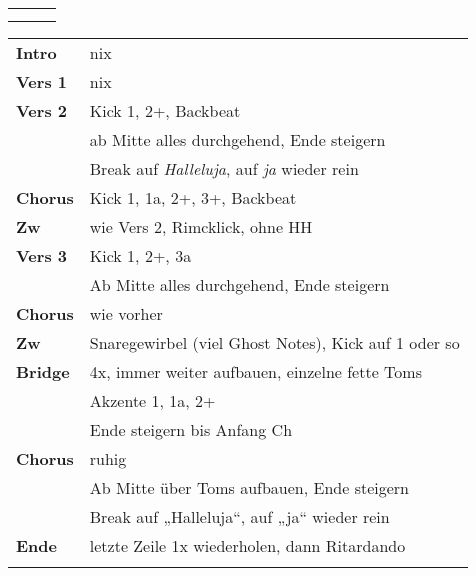 

\begin{tabular}{p{0.6cm}p{12cm}p{1.4cm}}
	\rowcolor{cyan} \myRow{\thesongnumber} & \myRow{Golgatha} & \myRow{79} \\
	                                       &                  &            \\
\end{tabular}

\begin{tabular}{p{1.6cm}l}
	\textbf{Intro}  & nix                                                       \\
	\textbf{Vers 1} & nix                                                       \\
	\textbf{Vers 2} & Kick 1, 2+, Backbeat                                      \\
	                & ab Mitte alles \achtel durchgehend, Ende steigern         \\
	                & Break auf \textit{Halleluja}, auf \textit{ja} wieder rein \\
	\textbf{Chorus} & Kick 1, 1a, 2+, 3+, Backbeat                              \\
	\textbf{Zw}     & wie Vers 2, Rimcklick, ohne HH                            \\
	\textbf{Vers 3} & Kick 1, 2+, 3a                                            \\
	                & Ab Mitte alles \achtel durchgehend, Ende steigern         \\
	\textbf{Chorus} & wie vorher                                                \\
	\textbf{Zw}     & Snaregewirbel (viel Ghost Notes), Kick auf 1 oder so      \\
	\textbf{Bridge} & 4x, immer weiter aufbauen, einzelne fette Toms            \\
	                & Akzente 1, 1a, 2+                                         \\
	                & Ende \achtel steigern bis Anfang Ch                       \\
	\textbf{Chorus} & ruhig                                                     \\
	                & Ab Mitte über Toms aufbauen, Ende \viertel steigern       \\
	                & Break auf „Halleluja“, auf „ja“ wieder rein               \\
	\textbf{Ende}   & letzte Zeile 1x wiederholen, dann Ritardando              \\
	                &                                                           \\
\end{tabular}
